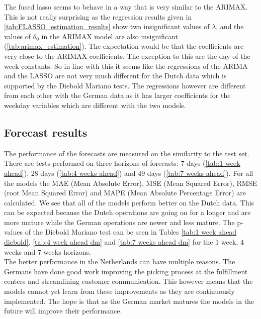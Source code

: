 The fused lasso seems to behave in a way that is very similar to the ARIMAX. This is not really surprising as the regression results given in \autoref{tab:FLASSO_estimation_results} show two insignificant values of $\lambda$, and the values of $\theta_0$ in the ARIMAX model are also insignificant (\autoref{tab:arimax_estimation}). The expectation would be that the coefficients are very close to the ARIMAX coefficients. The exception to this are the day of the week constants. So in line with this it seems like the regressions of the ARIMA and the LASSO are not very much different for the Dutch data which is supported by the Diebold Mariano tests. The regressions however are different from each other with the German data as it has larger coefficients for the weekday variables which are different with the two models.\\


\subsection{Forecast results}
\label{subsec:forecast_results}
The performance of the forecasts are measured on the similarity to the test set. There are tests performed on three horizons of forecasts: 7 days (\autoref{tab:1 week ahead}), 28 days (\autoref{tab:4 weeks ahead}) and 49 days (\autoref{tab:7 weeks ahead}). For all the models the MAE (Mean Absolute Error), MSE (Mean Squared Error), RMSE (root Mean Squared Error) and MAPE (Mean Absolute Percentage Error) are calculated. We see that all of the models perform better on the Dutch data. This can be expected because the Dutch operations are going on for a longer and are more mature while the German operations are newer and less mature. The p-values of the Diebold Mariano test can be seen in Tables \ref{tab:1 week ahead diebold}, \ref{tab:4 week ahead dm} and \ref{tab:7 weeks ahead dm} for the 1 week, 4 weeks and 7 weeks horizons.\\

The better performance in the Netherlands can have multiple reasons. The Germans have done good work improving the picking process at the fulfillment centers and streamlining customer communication. This however means that the models cannot yet learn from these improvements as they are continuously implemented. The hope is that as the German market matures the models in the future will improve their performance.\\

